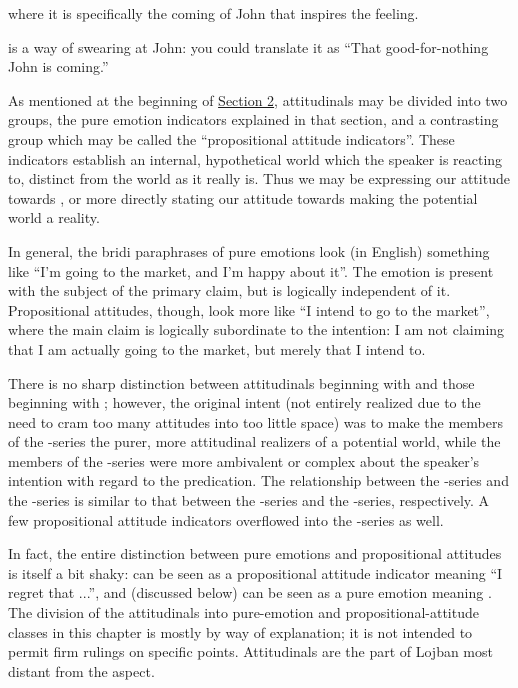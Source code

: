 {\noindent}where it is specifically the coming of John that inspires the
    feeling. 

 is a way of swearing at
    John: you could translate it as ``That good-for-nothing John is
    coming.''



As mentioned at the beginning of \hyperref[sec:13:2]{Section
    2}, attitudinals may be divided into two groups, the pure
    emotion indicators explained in that section, and a contrasting
    group which may be called the ``propositional attitude
    indicators''. These indicators establish an internal,
    hypothetical world which the speaker is reacting to, distinct
    from the world as it really is. Thus we may be expressing our
    attitude towards , or
    more directly stating our attitude towards making the potential
    world a reality.

In general, the bridi paraphrases of pure emotions look (in
    English) something like ``I'm going to the market, and I'm
    happy about it''. The emotion is present with the subject of
    the primary claim, but is logically independent of it.
    Propositional attitudes, though, look more like ``I intend to
    go to the market'', where the main claim is logically
    subordinate to the intention: I am not claiming that I am
    actually going to the market, but merely that I intend to.

There is no sharp distinction between attitudinals beginning
    with  and those beginning with ; however, the
    original intent (not entirely realized due to the need to cram
    too many attitudes into too little space) was to make the
    members of the -series the purer, more attitudinal
    realizers of a potential world, while the members of the
    -series were more ambivalent or complex about the
    speaker's intention with regard to the predication. The
    relationship between the -series and the -series is
    similar to that between the -series and the -series,
    respectively. A few propositional attitude indicators
    overflowed into the -series as well.

In fact, the entire distinction between pure emotions and
    propositional attitudes is itself a bit shaky:  can be
    seen as a propositional attitude indicator meaning ``I regret
    that ...'', and  (discussed below) can be seen as a pure
    emotion meaning . The division of the
    attitudinals into pure-emotion and propositional-attitude
    classes in this chapter is mostly by way of explanation; it is
    not intended to permit firm rulings on specific points.
    Attitudinals are the part of Lojban most distant from the
     aspect.

